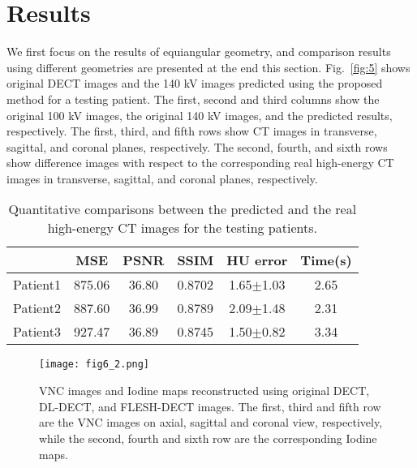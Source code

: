 \documentclass[journal,twoside,web]{ieeecolor}
\begin{document}
\section{Results}

We first focus on the results of equiangular geometry, and comparison results using different geometries are presented at the end this section.
Fig.~\ref{fig:5} shows original DECT images and the 140 kV images predicted using the proposed method for a testing patient. The first, second and third columns show the original 100 kV images, the original 140 kV images, and the predicted results, respectively. The first, third, and fifth rows show CT images in transverse, sagittal, and coronal planes, respectively. The second, fourth, and sixth rows show difference images with respect to the corresponding real high-energy CT images in transverse, sagittal, and coronal planes, respectively.
\begin{table}[t]%
    \begin{center}
        \caption{Quantitative comparisons between the predicted and the real high-energy CT images for the testing patients. }
        \begin{tabular}{ c | c c c c c }
            \hline\hline
             & MSE & PSNR & SSIM & HU error & Time(s) \\
            \hline
            Patient1 & 875.06 & 36.80 & 0.8702 & 1.65\(\pm\)1.03 & 2.65 \\
            Patient2 & 887.60 & 36.99 & 0.8789 & 2.09\(\pm\)1.48 & 2.31 \\
            Patient3 & 927.47 & 36.89 & 0.8745 & 1.50\(\pm\)0.82 & 3.34 \\
            \hline\hline
        \end{tabular}
        \label{tab:1}
    \end{center}
\end{table}
\begin{figure}[t]%
    \centering
        \texttt{[image: fig6\_2.png]}
        \caption{VNC images and Iodine maps reconstructed using original DECT, DL-DECT, and FLESH-DECT images. The first, third and fifth row are the VNC images on axial, sagittal and coronal view, respectively, while the second, fourth and sixth row are the corresponding Iodine maps. }
    \label{fig:6}
\end{figure}
\end{document}
